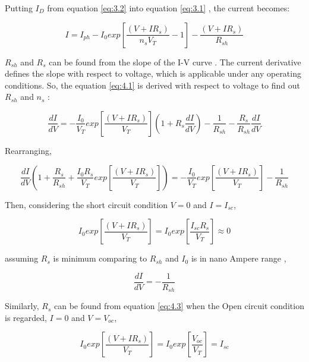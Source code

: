 Putting \( I_{D} \) from equation \ref{eq:3.2} into equation \ref{eq:3.1} , the current becomes:

\begin{equation}
\ I = I_{ph}-I_{0}exp\left[ \frac{(V + IR_{s})}{n_{s}V_{T}}-1\right]-\frac{(V + IR_{s})}{R_{sh}} \
\label{eq:4.1}
\end{equation}

\( R_{sh} \) and \( R_{s} \) can be found from the slope of the I-V curve \cite{badi2021accurate}. The current derivative defines the slope with respect to voltage, which is applicable under any operating conditions. So, the equation \ref{eq:4.1} is derived with respect to voltage to find out \( R_{sh} \)  and \( n_{s} \) \cite{gallegos2015analysis}:

\begin{equation}
\ \frac{dI}{dV} = -\frac{I_{0}}{V_{T}}exp\left[ \frac{(V + IR_{s})}{V_{T}}\right](1+R_{s}\frac{dI}{dV})-\frac{1}{R_{sh}}-\frac{ R_{s}}{R_{sh}}\frac{dI}{dV} \
\label{eq:4.2}
\end{equation}

Rearranging, 

\begin{equation}
\ \frac{dI}{dV}(1 +\frac{R_{s}}{R_{sh}} + \frac{I_{0}R_{s}}{V_{T}}exp\left[ \frac{(V + IR_{s})}{V_{T}}\right])   = -\frac{I_{0}}{V_{T}}exp\left[ \frac{(V + IR_{s})}{V_{T}}\right]-\frac{1}{R_{sh}} \
\label{eq:4.3}
\end{equation}

Then, considering the short circuit condition \(V = 0\) and  \(I = I_{sc} \),

\begin{equation}
\ I_{0}exp\left[ \frac{(V + IR_{s})}{V_{T}}\right]= I_{0} exp\left[ \frac{I_{sc}R_{s}}{V_{T}}\right] \approx 0  \
\label{eq:4.4}
\end{equation}
 
assuming \( R_{s} \) is minimum comparing to \( R_{sh}\) and \( I_{0} \) is in nano Ampere range \cite{badi2021accurate}, 

\begin{equation}
\ \frac{dI}{dV} = -\frac{1}{R_{sh}} \
\label{eq:4.5}
\end{equation}

Similarly, \( R_{s} \) can be found from equation \ref{eq:4.3} when the Open circuit condition is regarded, \(I = 0\) and \(V = V_{oc}\), 

\begin{equation}
\ I_{0}exp\left[ \frac{(V + IR_{s})}{V_{T}}\right]= I_{0} exp\left[ \frac{V_{oc}}{V_{T}}\right] = I_{sc}  \
\label{eq:4.6}
\end{equation}

